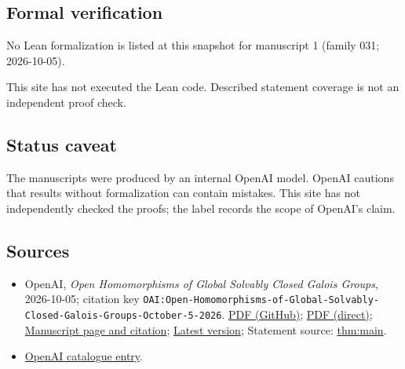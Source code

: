 \documentclass[11pt]{article}
\begin{document}
\subsection{Formal verification}
No Lean formalization is listed at this snapshot for manuscript 1 (family 031; 2026-10-05).

This site has not executed the Lean code. Described statement coverage is not an independent proof check.

\subsection{Status caveat}
The manuscripts were produced by an internal OpenAI model. OpenAI cautions that results without formalization can contain mistakes. This site has not independently checked the proofs; the label records the scope of OpenAI's claim.

\subsection{Sources}
\begin{itemize}
\item OpenAI, \emph{Open Homomorphisms of Global Solvably Closed Galois Groups}, 2026-10-05; citation key \texttt{OAI:Open-Homomorphisms-of-Global-Solvably-Closed-Galois-Groups-October-5-2026}. \href{https://github.com/openai/math/blob/adc7f1241b42e322a6451854ab7e4b4c146bf78a/preprints/Open-Homomorphisms-of-Global-Solvably-Closed-Galois-Groups-October-5-2026/open-homomorphisms-solvably-closed-galois-groups.pdf}{PDF (GitHub)}; \href{https://github.com/openai/math/raw/adc7f1241b42e322a6451854ab7e4b4c146bf78a/preprints/Open-Homomorphisms-of-Global-Solvably-Closed-Galois-Groups-October-5-2026/open-homomorphisms-solvably-closed-galois-groups.pdf}{PDF (direct)}; \href{https://github.com/openai/math/blob/adc7f1241b42e322a6451854ab7e4b4c146bf78a/preprints/Open-Homomorphisms-of-Global-Solvably-Closed-Galois-Groups-October-5-2026/README.md}{Manuscript page and citation}; \href{https://github.com/openai/math/blob/main/preprints/Open-Homomorphisms-of-Global-Solvably-Closed-Galois-Groups-October-5-2026/open-homomorphisms-solvably-closed-galois-groups.pdf}{Latest version}; Statement source: \href{https://github.com/openai/math/blob/adc7f1241b42e322a6451854ab7e4b4c146bf78a/preprints/Open-Homomorphisms-of-Global-Solvably-Closed-Galois-Groups-October-5-2026/build/sections/introduction.tex\#L11}{thm:main}.
\item \href{https://github.com/openai/math/blob/adc7f1241b42e322a6451854ab7e4b4c146bf78a/CONTENTS.md}{OpenAI catalogue entry}.
\end{itemize}
\end{document}
